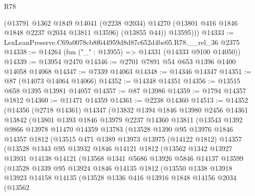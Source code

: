 \begin{lexlean}{R78}
\begin{coremodule}
          (@13791
            @1362
            @1849
            @14041
            (@2238 @2034)
            @14270
            (@13801 @416 @1846 @1848 @2237 @2034 @13811 @13596)
            (@13855 @44))
          @13595)))
@14333 := LexLeanPreserve.C69a0078cb8f644959d8d87c652d4be05.R78.__rel_36 @2375
@14338 := @14264 (fun ("_" : @13955) => @14331 (@14333 @9100 @14050))
@14339 := @13954 @2470
@14346 := @2701 @7891 @54 @653 @1396 @1400 @14058 @14068
@14347 := @7339 @14063
@14348 := @14346 @14347
@14351 := @87 (@14073 @14064 @14066)
@14352 := @14348 @14351
@14356 := @13515 @658 @1395 @13981 @14057
@14357 := @87 @13986
@14359 := @1794 @14357 @1812
@14360 := @11471 @14359
@14361 := @2238 @14360
@14513 := @14352
    (@14356
      (@2718 @14361)
      @14347
      (@13832
        @1394
        @1846
        @13980
        @2456
        @14361
        @13842
        (@13801
          @1393
          @1846
          @13979
          @2237
          @14360
          @13811
          (@13543
            @1392
            @9866
            @13978
            @11470
            @14359
            @13783
            (@13528
              @1390
              @95
              @13976
              @1846
              @14357
              @1812
              (@13515
                @471
                @1389
                @13973
                @13975
                (@14122 @1812)
                @14357
                (@13528
                  @1343
                  @95
                  @13932
                  @1846
                  @14121
                  @1812
                  (@13562
                    @1342
                    @13927
                    @13931
                    @14138
                    @14121
                    (@13568
                      @1341
                      @5686
                      @13926
                      @5846
                      @14137
                      @13599
                      (@13528
                        @1339
                        @95
                        @13924
                        @1846
                        @14135
                        @1812
                        (@13550
                          @1338
                          @13918
                          @13923
                          @14158
                          @14135
                          (@13528
                            @1336
                            @416
                            @13916
                            @1848
                            @14156
                            @2034
                            (@13562

\end{coremodule}
\end{lexlean}
